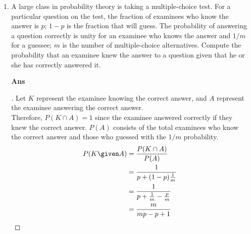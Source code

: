 \documentclass[paper=usletter, fontsize=12pt]{article}
\begin{document}
\begin{enumerate}
        \item A large class in probability theory is taking a multiple-choice
        test. For a particular question on the test, the fraction of examinees
        who know the answer is $p$; $1-p$ is the fraction that will guess. The
        probability of answering a question correctly is unity for an examinee
        who knows the answer and $1/m$ for a guessee; $m$ is the number of
        multiple-choice alternatives. Compute the probability that an examinee
        knew the answer to a question given that he or she has correctly
        answered it.
        \item[\textbf{Ans}]
        \begin{proof}[\unskip\nopunct]
            Let $K$ represent the examinee knowing the correct answer, and $A$
            represent the examinee answering the correct answer. \\
            Therefore, $P(K \cap A) = 1$ since the examinee answered correctly
            if they knew the correct answer. $P(A)$ consists of the total examinees who know the correct answer and those who guessed with the $1/m$ probability.
            \begin{align*}
                P(K \given A) & = \frac{P(K \cap A)}{P(A)} \\
                & = \frac{1}{p + (1-p)\frac{1}{m}} \\
                & = \frac{1}{p + \frac{1}{m}-\frac{p}{m}} \\
                & = \frac{m}{mp -p + 1} \qedhere
            \end{align*}
        \end{proof}
        \vspace{0.2in}


\end{enumerate}
\end{document}
